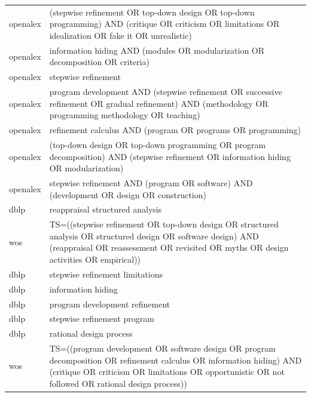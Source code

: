 \documentclass{article}
\begin{document}
\begin{longtable}{lp{10cm}}
openalex & (\textquotedbl{}stepwise refinement\textquotedbl{} OR \textquotedbl{}top-down design\textquotedbl{} OR \textquotedbl{}top-down programming\textquotedbl{}) AND (critique OR criticism OR limitations OR idealization OR \textquotedbl{}fake it\textquotedbl{} OR unrealistic) \\
openalex & \textquotedbl{}information hiding\textquotedbl{} AND (modules OR modularization OR decomposition OR criteria) \\
openalex & \textquotedbl{}stepwise refinement\textquotedbl{} \\
openalex & \textquotedbl{}program development\textquotedbl{} AND (\textquotedbl{}stepwise refinement\textquotedbl{} OR \textquotedbl{}successive refinement\textquotedbl{} OR \textquotedbl{}gradual refinement\textquotedbl{}) AND (methodology OR \textquotedbl{}programming methodology\textquotedbl{} OR teaching) \\
openalex & \textquotedbl{}refinement calculus\textquotedbl{} AND (program OR programs OR programming) \\
openalex & (\textquotedbl{}top-down design\textquotedbl{} OR \textquotedbl{}top-down programming\textquotedbl{} OR \textquotedbl{}program decomposition\textquotedbl{}) AND (\textquotedbl{}stepwise refinement\textquotedbl{} OR \textquotedbl{}information hiding\textquotedbl{} OR modularization) \\
openalex & \textquotedbl{}stepwise refinement\textquotedbl{} AND (program OR software) AND (development OR design OR construction) \\
dblp & reappraisal structured analysis \\
wos & TS=((\textquotedbl{}stepwise refinement\textquotedbl{} OR \textquotedbl{}top-down design\textquotedbl{} OR \textquotedbl{}structured analysis\textquotedbl{} OR \textquotedbl{}structured design\textquotedbl{} OR \textquotedbl{}software design\textquotedbl{}) AND (reappraisal OR reassessment OR revisited OR myths OR \textquotedbl{}design activities\textquotedbl{} OR empirical)) \\
dblp & stepwise refinement limitations \\
dblp & information hiding \\
dblp & program development refinement \\
dblp & stepwise refinement program \\
dblp & rational design process \\
wos & TS=((\textquotedbl{}program development\textquotedbl{} OR \textquotedbl{}software design\textquotedbl{} OR \textquotedbl{}program decomposition\textquotedbl{} OR \textquotedbl{}refinement calculus\textquotedbl{} OR \textquotedbl{}information hiding\textquotedbl{}) AND (critique OR criticism OR limitations OR opportunistic OR \textquotedbl{}not followed\textquotedbl{} OR \textquotedbl{}rational design process\textquotedbl{})) \\

\end{longtable}
\end{document}
